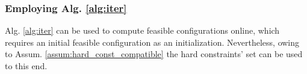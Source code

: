 \documentclass[letterpaper, 10 pt, conference]{ieeeconf}  %
\begin{document}
{\color{red}
\subsubsection{\textbf{Employing Alg. \ref{alg:iter}}}
Alg. \ref{alg:iter} can be used to compute feasible configurations online, which requires an initial feasible configuration as an initialization. Nevertheless, owing to Assum. \ref{assum:hard_const_compatible} the hard constraints' set can be used to this end. 
}
\end{document}
